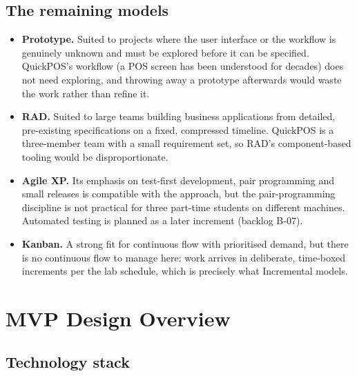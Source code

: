 \documentclass[11pt,a4paper]{article}
\begin{document}
\subsection{The remaining models}

\begin{itemize}
  \item \textbf{Prototype.} Suited to projects where the user interface or the workflow is
        genuinely unknown and must be explored before it can be specified. QuickPOS's
        workflow (a POS screen has been understood for decades) does not need exploring, and
        throwing away a prototype afterwards would waste the work rather than refine it.
  \item \textbf{RAD.} Suited to large teams building business applications from detailed,
        pre-existing specifications on a fixed, compressed timeline. QuickPOS is a
        three-member team with a small requirement set, so RAD's component-based tooling
        would be disproportionate.
  \item \textbf{Agile XP.} Its emphasis on test-first development, pair programming and small
        releases is compatible with the approach, but the pair-programming discipline is not
        practical for three part-time students on different machines. Automated testing is
        planned as a later increment (backlog B-07).
  \item \textbf{Kanban.} A strong fit for continuous flow with prioritised demand, but there
        is no continuous flow to manage here: work arrives in deliberate, time-boxed
        increments per the lab schedule, which is precisely what Incremental models.
\end{itemize}

\section{MVP Design Overview}
\label{sec:mvp}

\subsection{Technology stack}
\end{document}
